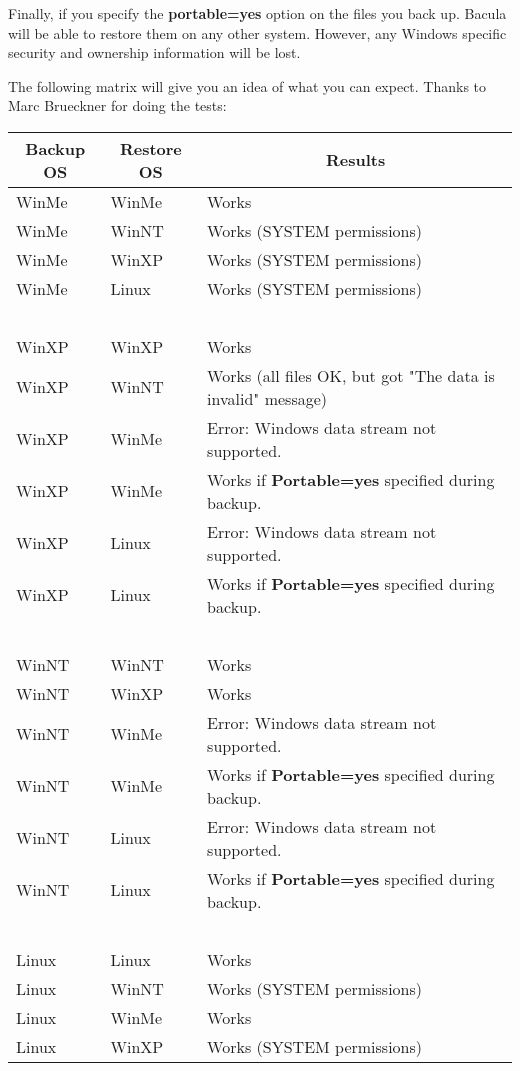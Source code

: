 Finally, if you specify the {\bf portable=yes} option on the files you back
up. Bacula will be able to restore them on any other system. However, any
Windows specific security and ownership information will be lost. 

The following matrix will give you an idea of what you can expect. Thanks to
Marc Brueckner for doing the tests: 

\begin{longtable}{|l|l|p{2.8in}|}
 \hline 
\multicolumn{1}{|c|}{\bf Backup OS} & \multicolumn{1}{c|}{\bf Restore OS}
& \multicolumn{1}{c|}{\bf Results } \\
 \hline {WinMe} & {WinMe} & {Works } \\
 \hline {WinMe} & {WinNT} & {Works (SYSTEM permissions) } \\
 \hline {WinMe} & {WinXP} & {Works (SYSTEM permissions) } \\
 \hline {WinMe} & {Linux} & {Works (SYSTEM permissions) } \\
 \hline {\ } & {\ } & {\ } \\
 \hline {WinXP} & {WinXP} & {Works } \\
 \hline {WinXP} & {WinNT} & {Works (all files OK, but got "The data is invalid"
message) } \\
 \hline {WinXP} & {WinMe} & {Error: Windows data stream not supported. } \\
 \hline {WinXP} & {WinMe} & {Works if {\bf Portable=yes} specified during backup.} \\
 \hline {WinXP} & {Linux} & {Error: Windows data stream not supported. } \\
 \hline {WinXP} & {Linux} & {Works if {\bf Portable=yes} specified during backup.}\\
 \hline {\ } & {\ } & {\ } \\
 \hline {WinNT} & {WinNT} & {Works } \\
 \hline {WinNT} & {WinXP} & {Works } \\
 \hline {WinNT} & {WinMe} & {Error: Windows data stream not supported. } \\
 \hline {WinNT} & {WinMe} & {Works if {\bf Portable=yes} specified during backup.}\\
 \hline {WinNT} & {Linux} & {Error: Windows data stream not supported. } \\
 \hline {WinNT} & {Linux} & {Works if {\bf Portable=yes} specified during backup. }\\
 \hline {\ } & {\ } & {\ } \\
 \hline {Linux} & {Linux} & {Works } \\
 \hline {Linux} & {WinNT} & {Works (SYSTEM permissions) } \\
 \hline {Linux} & {WinMe} & {Works } \\
 \hline {Linux} & {WinXP} & {Works (SYSTEM permissions)}
\\ \hline 
\end{longtable}

